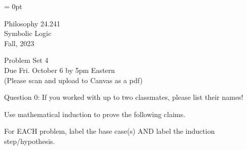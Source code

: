 \documentclass[12pt]{article}
\begin{document}
\pagestyle{empty}


\newcommand{\detritus}[1]{}

\thispagestyle{empty}
\parindent = 0pt
\vspace{30pt}

\hspace*{0.0in}\parbox[t]{2.5in}{
Philosophy 24.241\\[3pt]
Symbolic Logic \\[3pt]
Fall, 2023
}


\bigskip %


\begin{center}
\Large Problem Set 4\\[1ex] 
 Due Fri. October 6 by 5pm Eastern\\ 
  \vspace{.1in}
  \normalsize{(Please scan and upload to Canvas as a pdf)} \\[3ex] 
\end{center}


Question 0: If you worked with up to two classmates, please list their names! 

Use mathematical induction to prove the following claims.

For EACH problem, label the base case(s) AND label the induction step/hypothesis. 
\end{document}
